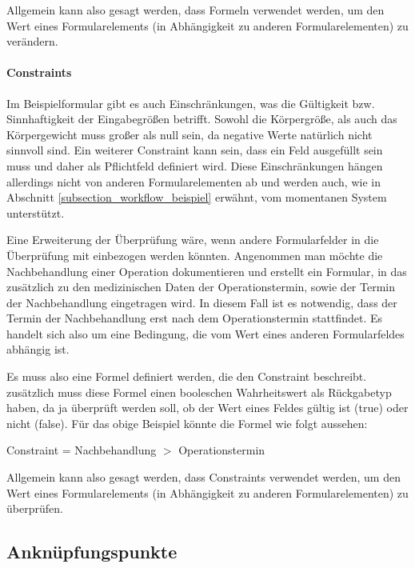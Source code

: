 Allgemein kann also gesagt werden, dass Formeln verwendet werden, um den Wert eines Formularelements (in Abhängigkeit zu anderen Formularelementen) zu verändern.

\paragraph{Constraints}

Im Beispielformular gibt es auch Einschränkungen, was die Gültigkeit bzw. Sinnhaftigkeit der Eingabegrößen betrifft. Sowohl die Kör\-per\-grö\-ße, als auch das Körpergewicht muss großer als null sein, da negative Werte natürlich nicht sinnvoll sind. Ein weiterer Constraint kann sein, dass ein Feld ausgefüllt sein muss und daher als Pflichtfeld definiert wird. Diese Einschränkungen hängen allerdings nicht von anderen Formularelementen ab und werden auch, wie in Abschnitt \ref{subsection_workflow_beispiel} erwähnt, vom momentanen System unterstützt.

Eine Erweiterung der Überprüfung wäre, wenn andere Formularfelder in die Überprüfung mit einbezogen werden könnten. Angenommen man möchte die Nachbehandlung einer Operation dokumentieren und erstellt ein Formular, in das zusätzlich zu den medizinischen Daten der Operationstermin, sowie der Termin der Nachbehandlung eingetragen wird. In diesem Fall ist es not\-wen\-dig, dass der Termin der Nachbehandlung erst nach dem Operationstermin stattfindet. Es handelt sich also um eine Bedingung, die vom Wert eines anderen Formularfeldes abhängig ist.

Es muss also eine Formel definiert werden, die den Constraint beschreibt. zusätzlich muss diese Formel einen booleschen Wahrheitswert als Rückgabetyp haben, da ja überprüft werden soll, ob der Wert eines Feldes gültig ist (true) oder nicht (false). Für das obige Beispiel könnte die Formel wie folgt aussehen:

\begin{center}
 Constraint = Nachbehandlung $ > $ Operationstermin
\end{center}

Allgemein kann also gesagt werden, dass Constraints verwendet werden, um den Wert eines Formularelements (in Abhängigkeit zu anderen Formularelementen) zu überprüfen.


\subsection{Anknüpfungspunkte}

